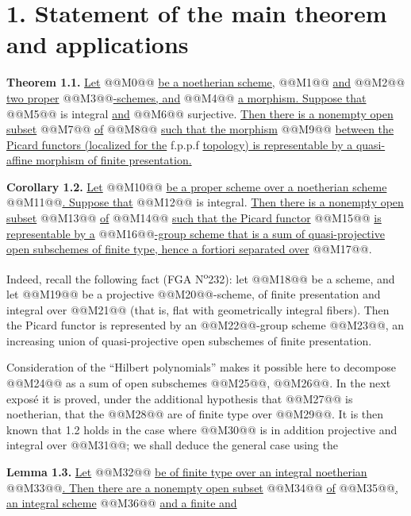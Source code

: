 \section*{1. Statement of the main theorem and applications}

\textbf{Theorem 1.1.} \uline{Let} @@M0@@ \uline{be a noetherian scheme,} @@M1@@ \uline{and} @@M2@@ \uline{two proper} @@M3@@\uline{-schemes, and} @@M4@@ \uline{a morphism. Suppose that} @@M5@@ is integral \uline{and} @@M6@@ surjective. \uline{Then there is a nonempty open subset} @@M7@@ \uline{of} @@M8@@ \uline{such that the morphism}
@@M9@@
\uline{between the Picard functors (localized for the} f.p.p.f \uline{topology) is representable by a quasi-affine morphism of finite presentation.}

\textbf{Corollary 1.2.} \uline{Let} @@M10@@ \uline{be a proper scheme over a noetherian scheme} @@M11@@\uline{. Suppose that} @@M12@@ is integral. \uline{Then there is a nonempty open subset} @@M13@@ \uline{of} @@M14@@ \uline{such that the Picard functor} @@M15@@ \uline{is representable by a} @@M16@@\uline{-group scheme that is a sum of quasi-projective open subschemes of finite type, hence a fortiori separated over} @@M17@@.

Indeed, recall the following fact (FGA N\textsuperscript{o}232): let @@M18@@ be a scheme, and let @@M19@@ be a projective @@M20@@-scheme, of finite presentation and integral over @@M21@@ (that is, flat with geometrically integral fibers). Then the Picard functor is represented by an @@M22@@-group scheme @@M23@@, an increasing union of quasi-projective open subschemes of finite presentation.

Consideration of the ``Hilbert polynomials'' makes it possible here to decompose @@M24@@ as a sum of open subschemes @@M25@@, @@M26@@. In the next exposé it is proved, under the additional hypothesis that @@M27@@ is noetherian, that the @@M28@@ are of finite type over @@M29@@. It is then known that 1.2 holds in the case where @@M30@@ is in addition projective and integral over @@M31@@; we shall deduce the general case using the

\textbf{Lemma 1.3.} \uline{Let} @@M32@@ \uline{be of finite type over an integral noetherian} @@M33@@\uline{. Then there are a nonempty open subset} @@M34@@ \uline{of} @@M35@@\uline{, an integral scheme} @@M36@@ \uline{and a finite and}

